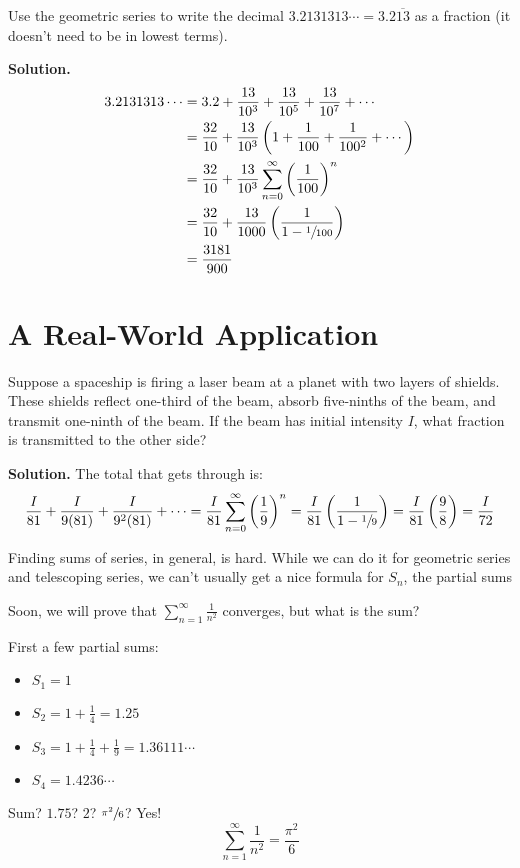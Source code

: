 \begin{Example}{}{}
    Use the geometric series to write the decimal
    $ 3.2131313\cdots=3.2\overline{13} $ as a fraction (it doesn't need to be in lowest terms).

    \textbf{Solution.}
    \begin{align*}
        3.2131313\cdots
         & =3.2+\frac{13}{10^3} +\frac{13}{10^5} +\frac{13}{10^7} +\cdots                            \\
         & =\frac{32}{10} +\frac{13}{10^3} \left( 1+\frac{1}{100} +\frac{1}{100^2}+\cdots  \right)   \\
         & =\frac{32}{10} +\frac{13}{10^3} \sum\limits_{n=0}^{\infty} \left( \frac{1}{100} \right)^n \\
         & =\frac{32}{10} +\frac{13}{1000} \left( \frac{1}{1-\sfrac{1}{100} } \right)                \\
         & =\frac{3181}{900}
    \end{align*}
\end{Example}

\section*{A Real-World Application}
Suppose a spaceship is firing a laser beam at a planet with two layers of shields. These shields reflect
one-third of the beam, absorb five-ninths of the beam, and transmit one-ninth of the beam.
If the beam has initial intensity $ I $, what fraction is transmitted to the other side?

\textbf{Solution.} The total that gets through is:
\[
    \frac{I}{81} +\frac{I}{9(81)} +\frac{I}{9^2(81)} +\cdots
    =\frac{I}{81} \sum\limits_{n=0}^{\infty} \left( \frac{1}{9}  \right)^n
    =\frac{I}{81} \left( \frac{1}{1-\sfrac{1}{9}}  \right)
    =\frac{I}{81} \left( \frac{9}{8}  \right)
    =\frac{I}{72}
\]

Finding sums of series, in general, is hard. While we can do it for geometric
series and telescoping series, we can't usually get a nice formula for $ S_n $,
the partial sums

Soon, we will prove that $ \sum\limits_{n=1}^{\infty} \frac{1}{n^2}  $ converges,
but what is the sum?

First a few partial sums:
\begin{itemize}
    \item $ S_1=1 $
    \item $ S_2=1+\frac{1}{4} =1.25 $
    \item $ S_3=1+\frac{1}{4} +\frac{1}{9} =1.36111\cdots $
    \item $ S_4=1.4236\cdots $
\end{itemize}
Sum? $ 1.75 $? $ 2 $? $ \sfrac{\pi^2}{6} $? Yes!
\[ \sum\limits_{n=1}^{\infty} \frac{1}{n^2} =\frac{\pi^2}{6} \]


